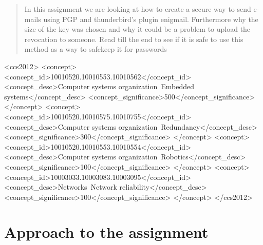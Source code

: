 \documentclass{sig-alternate-05-2015}
\begin{document}

\maketitle
\begin{abstract}
In this assignment we are looking at how to create a secure way to send e-mails using PGP and thunderbird's plugin enigmail. Furthermore why the size of the key was chosen and why it could be a problem to upload the revocation to someone. Read till the end to see if it is safe to use this method as a way to safekeep it for passwords
\end{abstract}


%
%
\begin{CCSXML}
<ccs2012>
 <concept>
  <concept_id>10010520.10010553.10010562</concept_id>
  <concept_desc>Computer systems organization~Embedded systems</concept_desc>
  <concept_significance>500</concept_significance>
 </concept>
 <concept>
  <concept_id>10010520.10010575.10010755</concept_id>
  <concept_desc>Computer systems organization~Redundancy</concept_desc>
  <concept_significance>300</concept_significance>
 </concept>
 <concept>
  <concept_id>10010520.10010553.10010554</concept_id>
  <concept_desc>Computer systems organization~Robotics</concept_desc>
  <concept_significance>100</concept_significance>
 </concept>
 <concept>
  <concept_id>10003033.10003083.10003095</concept_id>
  <concept_desc>Networks~Network reliability</concept_desc>
  <concept_significance>100</concept_significance>
 </concept>
</ccs2012>
\end{CCSXML}



%
%

%
%



\section{Approach to the assignment}
\end{document}
